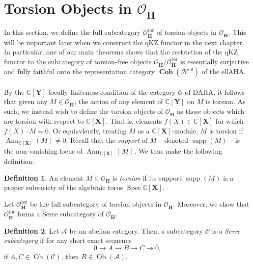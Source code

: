 \documentclass[a4paper]{report}
\theoremstyle{theorem}
\theoremstyle{definition}
\newtheorem{definition}{Definition}
\theoremstyle{remark}
\theoremstyle{proposition}
\theoremstyle{conjecture}
\theoremstyle{lemma}
\theoremstyle{corollary}
\theoremstyle{exercise}
\theoremstyle{example}
\newcommand{\C}{\mathbb{C}}
\newcommand{\mcal}{\mathcal}
\newcommand{\on}{\operatorname}
\newcommand{\spec}{\on{Spec}}
\newcommand{\coh}{\on{\mathbf{Coh}}}
\begin{document}
  \section{Torsion Objects in $\mcal{O}_{\mathbf{\ddot{\mathbf{H}}}}$}
  In this section, we define the full subcategory $\mcal{O}_{\mathbf{\ddot{\mathbf{H}}}}^{\on{tor}}$ of torsion objects in $\mcal{O}_{\ddot{\mathbf{H}}}$. This will be 
  important later when we construct the qKZ functor in the next chapter.
  In particular, one of our main theorems shows that the restriction of the qKZ 
  functor to the subcategory of torsion-free
  objects $\mcal{O}_{\mathbf{\ddot{\mathbf{H}}}}/\mcal{O}_{\ddot{\mathbf{H}}}^{\on{tor}}$
  is essentially surjective and fully faithful onto the representation category
  $\coh(\mcal{H}^{\on{ell}})$ of the ellAHA.\\\\
  By the $\C[\mathbf{Y}]$-locally finiteness condition of the category $\mcal{O}$ of DAHA, it follows that given any $M \in \mcal{O}_{\mathbf{\ddot{\mathbf{H}}}}$,
  the action of any element of $\C[\mathbf{Y}]$ on $M$ is torsion. As such, we instead wish to define the torsion objects of $\mcal{O}_{\mathbf{\ddot{\mathbf{H}}}}$ as 
  those objects which are torsion with respect to $\C[\mathbf{X}]$. That is, 
  elements $f(X) \in \C[\mathbf{X}]$ for which $f(X) \cdot M = 0$. Or equiavlently, treating $M$ as a $\C[\mathbf{X}]$-module, $M$ is torsion if 
  $\on{Ann}_{\C[\mathbf{X}]}(M) \neq 0$. Recall that the \emph{support} of $M$ -- denoted $\on{supp}(M)$ --
  is the non-vanishing locus of $\on{Ann}_{\C[\mathbf{X}]}(M)$.
  We thus make the following definition:
  
  \begin{definition}
      An element $M \in \mcal{O}_{\mathbf{\ddot{\mathbf{H}}}}$ is \emph{torsion} if its
      support $\on{supp}(M)$ is a proper subvariety of the algebraic torus 
      $\spec \C[\mathbf{X}]$.
  \end{definition}
  
  Let $\mcal{O}_{\mathbf{\ddot{\mathbf{H}}}}^{\on{tor}}$ be the full subcategory of 
  torsion objects in $\mcal{O}_{\mathbf{\ddot{\mathbf{H}}}}$. Moreover, we show that 
  $\mcal{O}_{\mathbf{\ddot{\mathbf{H}}}}^{\on{tor}}$ forms a Serre subcategory of 
  $\mcal{O}_{\mathbf{\ddot{\mathbf{H}}}}$.
  
  \begin{definition}
      Let $\mathscr{A}$ be an abelian category. Then, a subcategory $\mathscr{C}$
      is a \emph{Serre subcategory} if for any short exact sequence
      $$0\longrightarrow A \longrightarrow B \longrightarrow C \longrightarrow 0,$$
      if $A,C \in \on{Ob}(\mathscr{C})$, then $B \in \on{Ob}(\mathscr{A})$.
  \end{definition}
  
\end{document}
